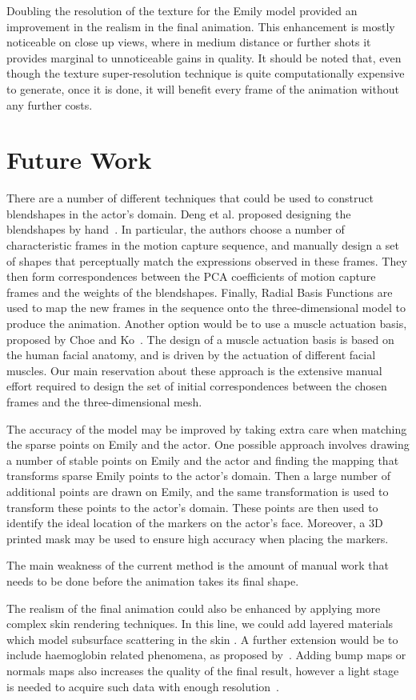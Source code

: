 Doubling the resolution of the texture for the Emily model provided an improvement in the realism in the final animation.
This enhancement is mostly noticeable on close up views, where in medium distance or further shots it provides marginal to unnoticeable gains in quality.
It should be noted that, even though the texture super-resolution technique is quite computationally expensive to generate, once it is done, it will benefit every frame of the animation without any further costs.


\section{Future Work}

There are a number of different techniques that could be used to construct blendshapes in the actor's domain. Deng et al. proposed designing the blendshapes by hand~\cite{Deng:2006}. In particular, the authors choose a number of characteristic frames in the motion capture sequence, and manually design a set of shapes that perceptually match the expressions observed in these frames. They then form correspondences between the PCA coefficients of motion capture frames and the weights of the blendshapes. Finally, Radial Basis Functions are used to map the new frames in the sequence onto the three-dimensional model to produce the animation. Another option would be to use a muscle actuation basis, proposed by Choe and Ko~\cite{Choe:2005}. The design of a muscle actuation basis is based on the human facial anatomy, and is driven by the actuation of different facial muscles. Our main reservation about these approach is the extensive manual effort required to design the set of initial correspondences between the chosen frames and the three-dimensional mesh.

The accuracy of the model may be improved by taking extra care when matching the sparse points on Emily and the actor. One possible approach involves drawing a number of stable points on Emily and the actor and finding the mapping that transforms sparse Emily points to the actor's domain. Then a large number of additional points are drawn on Emily, and the same transformation is used to transform these points to the actor's domain. These points are then used to identify the ideal location of the markers on the actor's face. Moreover, a 3D printed mask may be used to ensure high accuracy when placing the markers. %

The main weakness of the current method is the amount of manual work that needs to be done before the animation takes its final shape. 

The realism of the final animation could also be enhanced by applying more complex skin rendering techniques.
In this line, we could add layered materials which model subsurface scattering in the skin \cite{Weyrich2006}.
A further extension would be to include haemoglobin related phenomena, as proposed by~\cite{Donner2008, Jimenez2010}.
Adding bump maps or normals maps also increases the quality of the final result, however a light stage  is needed to acquire such data with enough resolution~\cite{Graham2013}.